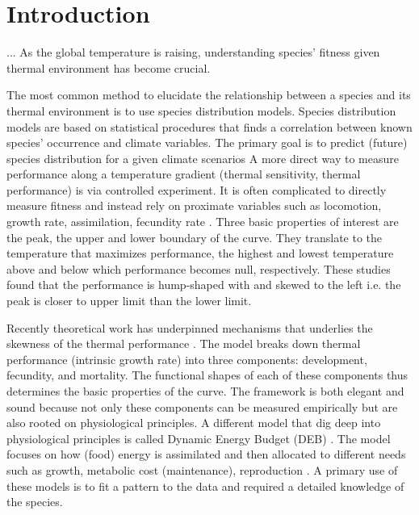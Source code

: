 \section*{Introduction}
...
As the global temperature is raising, understanding species' fitness given thermal environment has become crucial.

The most common method to elucidate the relationship between a species and its thermal environment is to use species distribution models. 
Species distribution models are based on  statistical procedures that finds a correlation between known species' occurrence and climate variables.
The primary goal is to predict (future) species distribution for a given climate scenarios \citep{Guisan2005, Austin2007, Elith2009}
A more direct way to measure performance along a temperature gradient (thermal sensitivity, thermal performance) is via controlled experiment.
It is often complicated to directly measure fitness and instead rely on proximate variables such as locomotion, growth rate, assimilation, fecundity rate \citep[][and reference therein]{Angilletta2009}.
Three basic properties of interest are the peak, the upper and lower boundary of the curve.
They translate to the temperature that maximizes performance, the highest and lowest temperature above and below which performance becomes null, respectively. 
These studies found that the performance is hump-shaped with and skewed to the left i.e. the peak is closer to upper limit than the lower limit.

Recently theoretical work has underpinned mechanisms that underlies the skewness of the thermal performance \citep{Amarasekare2012}.
The model  breaks down thermal performance (intrinsic growth rate)  into three components: development, fecundity, and mortality.
The functional shapes of each of these components thus determines the basic properties of the curve.
The framework is both elegant and sound because not only these components can be measured empirically but are also rooted on physiological principles.
A different model that dig deep into physiological principles is called Dynamic Energy Budget (DEB) \citep{Kooijman2009}.
The model focuses on how (food) energy is assimilated and then allocated to different needs such as growth, metabolic cost (maintenance), reproduction \citep{Kooijman2009}.
A primary use of  these models is to fit a pattern to the data and required a detailed knowledge of the species.  

